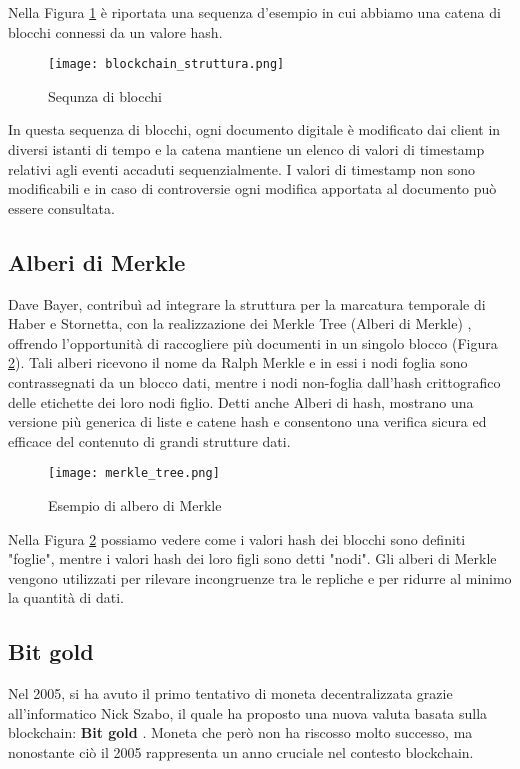 Nella Figura \ref{fig:blockchain_struttura} è riportata una sequenza d'esempio in cui abbiamo una catena di blocchi connessi da un valore hash.

\begin{figure}[h]
  \centering
  \texttt{[image: blockchain\_struttura.png]}
  \caption{Sequnza di blocchi}
  \label{fig:blockchain_struttura}
\end{figure}

In questa sequenza di blocchi, ogni documento digitale è modificato dai client in diversi istanti di tempo e la catena mantiene un elenco di valori di timestamp relativi agli eventi accaduti sequenzialmente. I valori di timestamp non sono modificabili e in caso di controversie ogni modifica apportata al documento può essere consultata.

\subsection{Alberi di Merkle}
Dave Bayer, contribuì ad integrare la struttura per la marcatura temporale di Haber e Stornetta, con la realizzazione dei Merkle Tree (Alberi di Merkle) \cite{bayer1993improving}, offrendo l'opportunità di raccogliere più documenti in un singolo blocco (Figura \ref{fig:merkle_tree}). Tali alberi ricevono il nome da Ralph Merkle e in essi i nodi foglia sono contrassegnati da un blocco dati, mentre i nodi non-foglia dall'hash crittografico delle etichette dei loro nodi figlio. Detti anche Alberi di hash, mostrano una versione più generica di liste e catene hash e consentono una verifica sicura ed efficace del contenuto di grandi strutture dati.

\begin{figure}[h]
  \centering
  \texttt{[image: merkle\_tree.png]}
  \caption{Esempio di albero di Merkle}
  \label{fig:merkle_tree}
\end{figure}

Nella Figura \ref{fig:merkle_tree} possiamo vedere come i valori hash dei blocchi sono definiti "foglie", mentre i valori hash dei loro figli sono detti "nodi". Gli alberi di Merkle vengono utilizzati per rilevare incongruenze tra le repliche e per ridurre al minimo la quantità di dati.

\subsection{Bit gold}
Nel 2005, si ha avuto il primo tentativo di moneta decentralizzata grazie all'informatico Nick Szabo, il quale ha proposto una nuova valuta basata sulla blockchain: \textbf{Bit gold} \cite{szabo_2005}. Moneta che però non ha riscosso molto successo, ma nonostante ciò il 2005 rappresenta un anno cruciale nel contesto blockchain.

